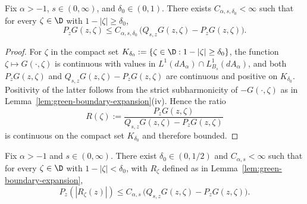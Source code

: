 \begin{numlemma}\label{lem:interior-green-gap}
Fix $\alpha>-1$, $s\in(0,\infty)$, and $\delta_0\in(0,1)$.  There exists
$C_{\alpha,s,\delta_0}<\infty$ such that for every $\zeta\in\D$ with
$1-|\zeta|\ge\delta_0$,
\[
P_zG(z,\zeta)
\le
C_{\alpha,s,\delta_0}\,
\bigl(Q_{s,z}G(z,\zeta)-P_zG(z,\zeta)\bigr).
\]
\end{numlemma}

\begin{proof}
For $\zeta$ in the compact set
$K_{\delta_0}:=\{\zeta\in\D:1-|\zeta|\ge\delta_0\}$, the function
$\zeta\mapsto G(\cdot,\zeta)$ is continuous with values in
$L^1(dA_\alpha)\cap L^1_{B_s}(dA_\alpha)$, and both
$P_zG(z,\zeta)$ and $Q_{s,z}G(z,\zeta)-P_zG(z,\zeta)$ are continuous and
positive on $K_{\delta_0}$.  Positivity of the latter follows from the strict
subharmonicity of $-G(\cdot,\zeta)$ as in Lemma~\ref{lem:green-boundary-expansion}(iv).
Hence the ratio
\[
R(\zeta):=
\frac{P_zG(z,\zeta)}
{Q_{s,z}G(z,\zeta)-P_zG(z,\zeta)}
\]
is continuous on the compact set $K_{\delta_0}$ and therefore bounded.
\end{proof}


\begin{numlemma}\label{lem:boundary-remainder-control}
Fix $\alpha>-1$ and $s\in(0,\infty)$.  There exist $\delta_0\in(0,1/2)$
and $C_{\alpha,s}<\infty$ such that for every $\zeta\in\D$ with
$1-|\zeta|<\delta_0$, with $R_\zeta$ defined as in
Lemma~\ref{lem:green-boundary-expansion},
\[
P_z(|R_\zeta(z)|)
\le
C_{\alpha,s}\,
\bigl(Q_{s,z}G(z,\zeta)-P_zG(z,\zeta)\bigr).
\]
\end{numlemma}

